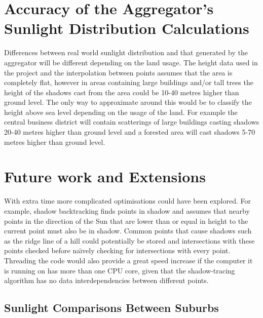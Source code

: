 \documentclass[12pt]{report}
\newcommand{\note}[1]{}
\newcommand{\notedme}[1]{}
\begin{document}
\section{Accuracy of the Aggregator's Sunlight Distribution Calculations}
Differences between real world sunlight distribution and that generated by the aggregator will be different depending on the land usage. The height data used in the project and the interpolation between points assumes that the area is completely flat, however in areas containing large buildings and/or tall trees the height of the shadows cast from the area could be 10-40 metres higher than ground level. The only way to approximate around this would be to classify the height above sea level depending on the usage of the land. For example the central business district will contain scatterings of large buildings casting shadows 20-40 metres higher than ground level and a forested area will cast shadows 5-70 metres higher than ground level.

\section{Future work and Extensions}
With extra time more complicated optimisations could have been explored. For example, shadow backtracking
finds points in shadow and assumes that nearby points in the direction of the Sun that are lower than or equal in height to the current point must also be in shadow. Common points that cause shadows such as the ridge line of a hill could potentially be stored and intersections with these points checked before na\"{\i}vely checking for intersections with every point. Threading the code would also provide a great speed increase if the computer it is running on has more than one CPU core, given that the shadow-tracing algorithm has no data interdependencies between different points.\notedme{you need to justify this by saying that you know the data is separable. Some software has data dependencies that means multi-core systems won't speed it up.}\note{this is stated earlier in the section but I'll add it again here}
\note{Part on the suburb masking code}

\subsection{Sunlight Comparisons Between Suburbs}
\end{document}
